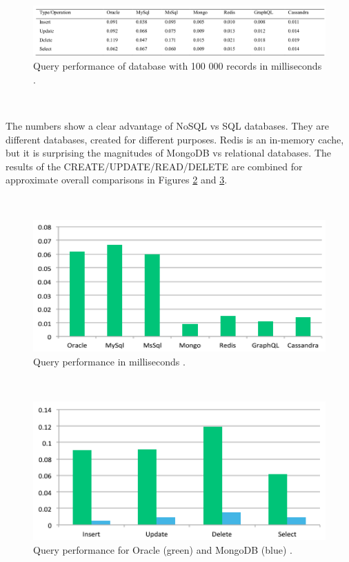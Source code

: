 \documentclass[12pt,english]{article} %
\begin{document}
\

\begin{figure}[H]
    \centering
    \includegraphics[scale=0.37]{img/db/performance/query-performance-databases.png}
    \caption{Query performance of database with 100 000 records in milliseconds \cite{comparison-query-performance-relational-and-non-relational-databases}.}
    \label{fig:query-performance-databases}
\end{figure}

\

The numbers show a clear advantage of NoSQL vs SQL databases.
They are different databases, created for different purposes.
Redis is an in-memory cache, but it is surprising the magnitudes of MongoDB vs relational databases.
The results of the CREATE/UPDATE/READ/DELETE are combined for approximate overall comparisons in Figures \ref{fig:query-performance-sql-nosql} and \ref{fig:query-performance-oracle-mogodb}.

\

\begin{figure}[H]
    \centering
    \includegraphics[width=0.625\linewidth]{img/db/performance/query-performance-sql-nosql.png}
    \caption{Query performance in milliseconds \cite{comparison-query-performance-relational-and-non-relational-databases}.
    \label{fig:query-performance-sql-nosql}}
\end{figure}

\

\begin{figure}[H]
    \centering
    \includegraphics[width=0.625\linewidth]{img/db/performance/query-performance-oracle-mogodb.png}
    \caption{Query performance for Oracle (green) and MongoDB (blue) \cite{comparison-query-performance-relational-and-non-relational-databases}.
    \label{fig:query-performance-oracle-mogodb}}
\end{figure}
\end{document}
